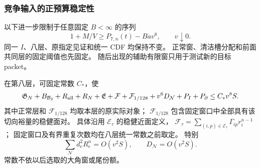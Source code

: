 \subsubsection{竞争输入的正预算稳定性}

以下进一步限制于任意固定 \(B<\infty\) 的序列
\begin{equation}\label{eighth:exact-competitive}
 1+M/V\ge P_{7,n}(t)-Bav^8,\qquad v\downarrow0.
\end{equation}
同一 \(I\)、八层、原指定见证和统一 CDF 均保持不变。
正常窗、清洁槽分配和前面共同层的固定阈值也先固定。
随后出现的辅助有限窗只用于测试新的目标 packet。

\begin{lemma}[八阶稳定预算]\label{eighth:exact-stability}
在第八层，可固定常数 \(C_*\)，使
\begin{equation}\label{eighth:exact-stable-budget}
 \mathfrak G_N+B_{\mathcal B_2}+R_{\rm all}+R_N+\mathfrak E
 +\mathcal F+\mathcal F_{1/128}+v^6D_{\mathcal N}
 +P_I+P_\partial\le C_*v^8S.
\end{equation}
其中正常层和 \(\mathcal F_{1/128}\) 均取本层的原实际对象；
\(\mathcal F_{1/128}\) 包含固定窗口中全部具有该切向裕量的稳健面对。
具体沿用 \(\mathscr E_\tau\) 的稳健近面定义，
\(\mathcal F_\tau=\sum_{(i,p)\in\mathscr E_\tau}\Gamma_{ip}r_i^{n-1}\)；
固定窗口及有界重复次数均在八层统一常数之前取定。
特别
\[
 \sum_{\mathcal N}d_e^2R_e^n=O(v^2S),\qquad
 D_{\mathcal N}=O(v^2S).
\]
常数不依以后选取的大角窗或尾份额。
\end{lemma}
